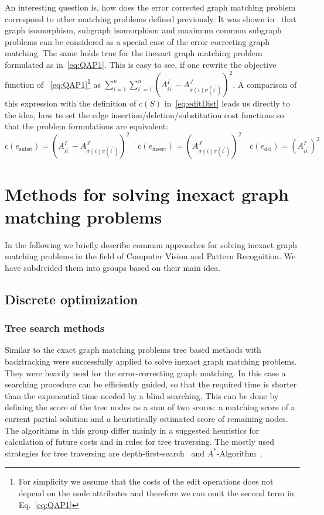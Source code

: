 An interesting question is, how does the error corrected graph matching problem correspond to other matching problems defined previously. It was shown in~\cite{Bunke1999_UnderlyingCosts} that graph isomorphism, subgraph isomorphism and maximum common subgraph problems can be considered as a special case of the error correcting graph matching. The same holds true for the inexact graph matching problem formulated as in~\eqref{eq:QAP1}. This is easy to see, if one rewrite the objective function of ~\eqref{eq:QAP1}\footnote{For simplicity we assume that the costs of the edit operations does not depend on the node attributes and therefore we can omit the second term in Eq.~\eqref{eq:QAP1}} as $\sum_{i=1}^n\sum_{i^\prime=1}^{n}(A^I_{ii^\prime}-A^J_{\sigma(i)\sigma(i^\prime)})^2$. A comparison of this expression with the definition of $c(S)$ in~\eqref{eq:editDist} leads us directly to the idea, how to set the edge insertion/deletion/substitution cost functions so that the problem formulations are equivalent: 
\begin{equation*}
c(e_{\text{subst}})=(A^I_{ii^\prime}-A^J_{\sigma(i)\sigma(i^\prime)})^2\quad c(e_{\text{insert}})=(A^J_{\sigma(i)\sigma(i^\prime)})^2\quad c(e_{\text{del}})=(A^I_{ii^\prime})^2
\end{equation*}
\section{Methods for solving inexact graph matching problems}
In the following we briefly describe common approaches for solving inexact graph matching problems in the field of Computer Vision and Pattern Recognition. We have subdivided them into groups based on their main idea.
\subsection{Discrete optimization}
\subsubsection{Tree search methods}
Similar to the exact graph matching problems tree based methods with backtracking were successfully applied to solve inexact graph matching problems. They were heavily used for the error-correcting graph matching. In this case a searching procedure can be efficiently guided, so that the required time is shorter than the exponential time needed by a blind searching. This can be done by defining the score of the tree nodes as a sum of two scores: a matching score of a current partial solution and a heuristically estimated score of remaining nodes. The algorithms in this group differ mainly in a suggested heuristics for calculation of future costs and in rules for tree traversing. The mostly used strategies for tree traversing are depth-first-search~\cite{Cormen} and $A^*$-Algorithm~\cite{AStar}.

